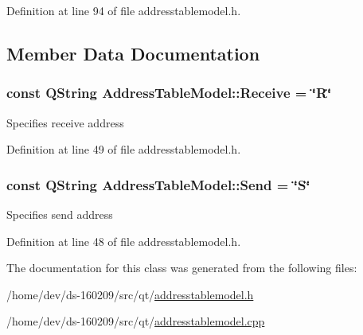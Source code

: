 Definition at line 94 of file addresstablemodel.\+h.



\subsection{Member Data Documentation}
\hypertarget{class_address_table_model_acaed83193545456eab47dd7be1d2ceba}{}
\subsubsection[{Receive}]{\setlength{\rightskip}{0pt plus 5cm}const Q\+String Address\+Table\+Model\+::\+Receive = \char`\"{}R\char`\"{}\hspace{0.3cm}{\ttfamily [static]}}\label{class_address_table_model_acaed83193545456eab47dd7be1d2ceba}
Specifies receive address 

Definition at line 49 of file addresstablemodel.\+h.

\hypertarget{class_address_table_model_a7c74e158d014a757c2edcc5bcb1e9a62}{}
\subsubsection[{Send}]{\setlength{\rightskip}{0pt plus 5cm}const Q\+String Address\+Table\+Model\+::\+Send = \char`\"{}S\char`\"{}\hspace{0.3cm}{\ttfamily [static]}}\label{class_address_table_model_a7c74e158d014a757c2edcc5bcb1e9a62}
Specifies send address 

Definition at line 48 of file addresstablemodel.\+h.



The documentation for this class was generated from the following files\+:\begin{DoxyCompactItemize}
\item 
/home/dev/ds-\/160209/src/qt/\hyperlink{addresstablemodel_8h}{addresstablemodel.\+h}\item 
/home/dev/ds-\/160209/src/qt/\hyperlink{addresstablemodel_8cpp}{addresstablemodel.\+cpp}\end{DoxyCompactItemize}
